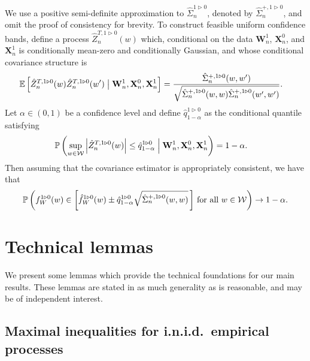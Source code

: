 \documentclass[11pt,lof]{puthesis}
\renewcommand{\P}{\ensuremath{\mathbb{P}}}
\newcommand{\E}{\ensuremath{\mathbb{E}}}
\newcommand{\bW}{\ensuremath{\mathbf{W}}}
\newcommand{\bX}{\ensuremath{\mathbf{X}}}
\newcommand{\cW}{\ensuremath{\mathcal{W}}}
\theoremstyle{break}
\theoremstyle{proof}
\begin{document}
%
We use a positive semi-definite approximation to
$\hat\Sigma_n^{1 \triangleright 0}$, denoted by
$\hat\Sigma_n^{+, 1 \triangleright 0}$,
and omit the proof of consistency for brevity.
To construct feasible uniform confidence bands,
define a process $\hat Z_n^{T, 1 \triangleright 0}(w)$ which,
conditional on the data $\bW_n^1$, $\bX_n^0$, and $\bX_n^1$
is conditionally mean-zero and conditionally Gaussian, and whose
conditional covariance structure is
%
\begin{align*}
  \E\left[
    \hat Z_n^{T, 1 \triangleright 0}(w)
    \hat Z_n^{T, 1 \triangleright 0}(w')
  \bigm| \bW_n^1, \bX_n^0, \bX_n^1 \right]
  &=
  \frac{\hat \Sigma_n^{+, 1 \triangleright 0}(w,w')}
  {\sqrt{\hat \Sigma_n^{+, 1 \triangleright 0}(w,w)
  \hat \Sigma_n^{+, 1 \triangleright 0}(w',w')}}.
\end{align*}
%
Let $\alpha \in (0,1)$ be a confidence level and define
$\hat q_{1-\alpha}^{1 \triangleright 0}$
as the conditional quantile satisfying
%
\begin{align*}
  \P\left(
    \sup_{w \in \cW}
    \left| \hat Z_n^{T, 1 \triangleright 0}(w) \right|
    \leq \hat q_{1-\alpha}^{1 \triangleright 0}
    \Bigm\vert \bW_n^1, \bX_n^0, \bX_n^1
  \right)
  &=
  1 - \alpha.
\end{align*}
%
Then assuming that the covariance estimator is appropriately consistent,
we have that
%
\begin{align*}
  \P\left(
    f_W^{1 \triangleright 0}(w)
    \in
    \left[
      \hat f_W^{1 \triangleright 0}(w)
      \pm
      \hat q^{1 \triangleright 0}_{1-\alpha}
      \sqrt{\hat\Sigma_n^{+, 1 \triangleright 0}(w,w)}
    \,\right]
    \,\textup{for all }
    w \in \cW
  \right)
  \to 1 - \alpha.
\end{align*}

\section{Technical lemmas}
\label{sec:kernel_app_technical}

We present some lemmas which provide the technical foundations for our main
results. These lemmas are stated in as much generality as is reasonable,
and may be of independent interest.

\subsection{Maximal inequalities for i.n.i.d.\ empirical processes}
\end{document}
